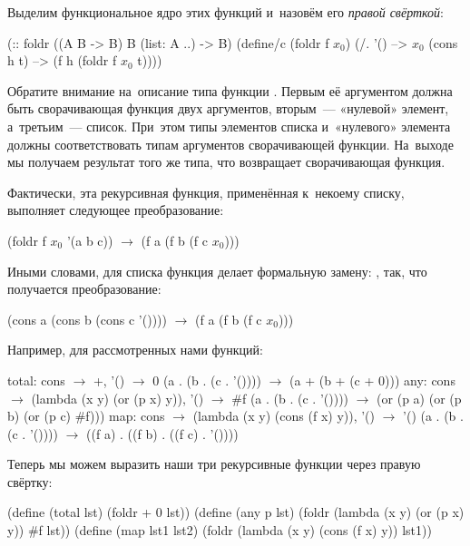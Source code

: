 Выделим функциональное ядро этих функций и~назовём его \emph{правой свёрткой}:\label{foldr}

\begin{SchemeCode}[emph={f,h,t}]
(:: foldr ((A B -> B) B (list: A ..) -> B)
 (define/c (foldr f $x_0$)
   (/. '() --> $x_0$
       (cons h t) --> (f h (foldr f $x_0$ t))))
\end{SchemeCode}

Обратите внимание на~описание типа функции . Первым её аргументом должна быть сворачивающая функция двух аргументов, вторым~--- «нулевой» элемент, а~третьим~--- список. При~этом типы элементов списка и~«нулевого» элемента должны соответствовать типам аргументов сворачивающей функции. На~выходе мы получаем результат того же типа, что возвращает сворачивающая функция.

Фактически, эта рекурсивная функция, применённая к~некоему списку, выполняет следующее преобразование:
\begin{SchemeCode}[emph=f]
        (foldr f $x_0$ '(a b c)) $\rightarrow$ (f a (f b (f c $x_0$)))
\end{SchemeCode}
Иными словами, для списка  функция  делает формальную замену: , 
так, что получается преобразование:
\begin{SchemeCode}[emph=f]
    (cons a (cons b (cons c '()))) $\rightarrow$ (f a (f b (f c $x_0$)))
\end{SchemeCode}

\newpage\noindent
Например, для рассмотренных нами функций:

\begin{SchemeCode}
total:  
 cons $\rightarrow$ +,  '() $\rightarrow$ 0  
 (a . (b . (c . '()))) $\rightarrow$ (a + (b + (c + 0)))%
any: 
 cons $\rightarrow$ (lambda (x y) (or (p x) y)), '() $\rightarrow$ #f  
 (a . (b . (c . '()))) $\rightarrow$ (or (p a) (or (p b) (or (p c) #f)))%
map:
 cons $\rightarrow$ (lambda (x y) (cons (f x) y)), '() $\rightarrow$ '() 
 (a . (b . (c . '()))) $\rightarrow$ ((f a) . ((f b) . ((f c) . '())))
\end{SchemeCode}

Теперь мы можем выразить наши три рекурсивные функции через правую свёртку:

\begin{Definition}[emph={lst,x,y,lst1,lst2,p}]
(define (total lst)
  (foldr + 0 lst))%
(define (any p lst)
  (foldr (lambda (x y) (or (p x) y)) #f lst))%
(define (map lst1 lst2)
  (foldr (lambda (x y) (cons (f x) y))  lst1)) 
\end{Definition}

